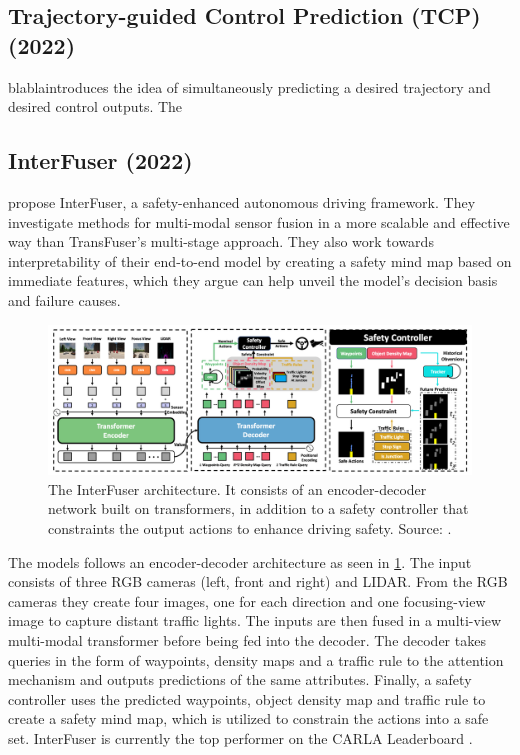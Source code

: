 \subsection{Trajectory-guided Control Prediction (TCP) (2022)}
blabla\todo introduces the idea of simultaneously predicting a desired trajectory and desired control outputs.
The


\subsection{InterFuser (2022)}
\textcite{shao2022interfuser} propose InterFuser, a safety-enhanced autonomous driving framework. They investigate methods for multi-modal sensor fusion in a more scalable and effective way than TransFuser's multi-stage approach. They also work towards interpretability of their end-to-end model by creating a safety mind map based on immediate features, which they argue can help unveil the model's decision basis and failure causes.

\begin{figure}[htbp]
    \centering
    \includegraphics[width=\textwidth]{chapters/2-background/figures/interfuser.png}
    \caption{The InterFuser architecture. It consists of an encoder-decoder network built on transformers, in addition to a safety controller that constraints the output actions to enhance driving safety. Source: \cite{shao2022interfuser}.}
    \label{fig:interfuser}
\end{figure}

The models follows an encoder-decoder architecture as seen in \cref{fig:interfuser}. The input consists of three RGB cameras (left, front and right) and LIDAR. From the RGB cameras they create four images, one for each direction and one focusing-view image to capture distant traffic lights. The inputs are then fused in a multi-view multi-modal transformer before being fed into the decoder. The decoder takes queries in the form of waypoints, density maps and a traffic rule to the attention mechanism and outputs predictions of the same attributes. Finally, a safety controller uses the predicted waypoints, object density map and traffic rule to create a safety mind map, which is utilized to constrain the actions into a safe set. InterFuser is currently the top performer on the CARLA Leaderboard \cite{shao2022interfuser, pwc-carla}.
